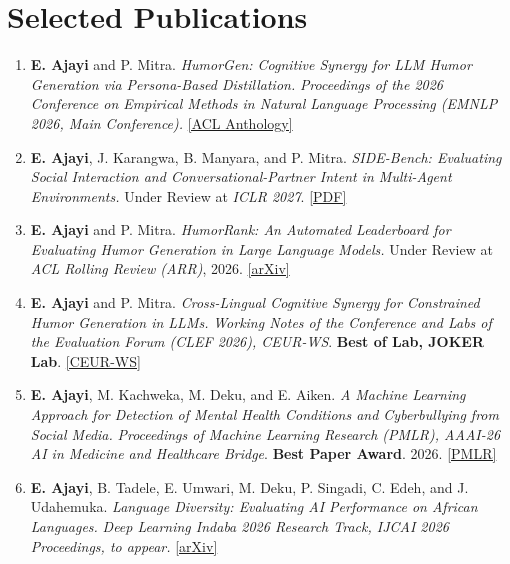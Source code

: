 \documentclass[letterpaper,10.99pt]{article}
\begin{document}
\section{Selected Publications}

\begin{enumerate}

    \item \textbf{E. Ajayi} and P. Mitra. 
    \textit{HumorGen: Cognitive Synergy for LLM Humor Generation via Persona-Based Distillation.} 
    \textit{Proceedings of the 2026 Conference on Empirical Methods in Natural Language Processing (EMNLP 2026, Main Conference).} 
    \href{https://aclanthology.org/2026.emnlp-main.808.pdf}{[ACL Anthology]}

    \item \textbf{E. Ajayi}, J. Karangwa, B. Manyara, and P. Mitra. 
    \textit{SIDE-Bench: Evaluating Social Interaction and Conversational-Partner Intent in Multi-Agent Environments.} 
    Under Review at \textit{ICLR 2027}. 
    \href{https://edwardajayi.github.io/assets/papers/SIDEBench.pdf}{[PDF]}

    \item \textbf{E. Ajayi} and P. Mitra. 
    \textit{HumorRank: An Automated Leaderboard for Evaluating Humor Generation in Large Language Models.} 
    Under Review at \textit{ACL Rolling Review (ARR)}, 2026. 
    \href{https://arxiv.org/pdf/2604.19786}{[arXiv]}

    \item \textbf{E. Ajayi} and P. Mitra. 
    \textit{Cross-Lingual Cognitive Synergy for Constrained Humor Generation in LLMs.} 
    \textit{Working Notes of the Conference and Labs of the Evaluation Forum (CLEF 2026), CEUR-WS}. 
    \textbf{Best of Lab, JOKER Lab}. 
    \href{https://ceur-ws.org/Vol-4283/paper306.pdf}{[CEUR-WS]}

    \item \textbf{E. Ajayi}, M. Kachweka, M. Deku, and E. Aiken. 
    \textit{A Machine Learning Approach for Detection of Mental Health Conditions and Cyberbullying from Social Media.} 
    \textit{Proceedings of Machine Learning Research (PMLR), AAAI-26 AI in Medicine and Healthcare Bridge}. 
    \textbf{Best Paper Award}. 2026. 
    \href{https://proceedings.mlr.press/v317/ajayi26a.html}{[PMLR]}

    \item \textbf{E. Ajayi}, B. Tadele, E. Umwari, M. Deku, P. Singadi, C. Edeh, and J. Udahemuka. 
    \textit{Language Diversity: Evaluating AI Performance on African Languages.} 
    \textit{Deep Learning Indaba 2026 Research Track, IJCAI 2026 Proceedings, to appear.} 
    \href{https://arxiv.org/pdf/2512.01557}{[arXiv]}


\end{enumerate}
\end{document}
